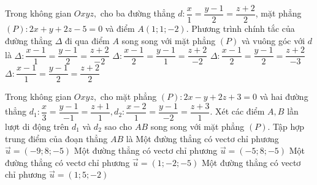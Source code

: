 \begin{ex}%
	Trong không gian $Oxyz,$ cho ba đường thẳng $d\colon \dfrac{x}{1}=\dfrac{y-1}{2}=\dfrac{z+2}{2}$, mặt phẳng $(P)\colon 2x+y+2z-5=0$ và điểm $A(1;1;-2)$. Phương trình chính tắc của đường thẳng $\Delta$ đi qua điểm $A$ song song với mặt phẳng $(P)$ và vuông góc với $d$ là
	\choice
	{$\Delta\colon\dfrac{x-1}{1}=\dfrac{y-1}{2}=\dfrac{z+2}{-2}$}
	{$\Delta\colon\dfrac{x-1}{2}=\dfrac{y-1}{1}=\dfrac{z+2}{-2}$}
	{\True $\Delta\colon\dfrac{x-1}{2}=\dfrac{y-1}{2}=\dfrac{z+2}{-3}$}
	{$\Delta\colon\dfrac{x-1}{1}=\dfrac{y-1}{2}=\dfrac{z+2}{2}$}
\end{ex}
\begin{ex}%
	Trong không gian $Oxyz,$ cho mặt phẳng $(P)\colon 2x-y+2z+3=0$ và hai đường thẳng $d_1\colon \dfrac{x}{3}=\dfrac{y-1}{-1}=\dfrac{z+1}{1}, d_2\colon \dfrac{x-2}{1}=\dfrac{y-1}{-2}=\dfrac{z+3}{1}$. Xét các điểm $A, B$ lần lượt di động trên $d_1$ và $d_2$ sao cho $AB$ song song với mặt phẳng $(P)$. Tập hợp trung điểm của đoạn thẳng $AB$ là
	\choice
	{\True Một đường thẳng có vectơ chỉ phương $\overrightarrow{u}=(-9;8;-5)$ }
	{Một đường thẳng có vectơ chỉ phương $\overrightarrow{u}=(-5;8;-5)$ }
	{Một đường thẳng có vectơ chỉ phương $\overrightarrow{u}=(1;-2;-5)$ }
	{Một đường thẳng có vectơ chỉ phương $\overrightarrow{u}=(1;5;-2)$ }
\end{ex}
